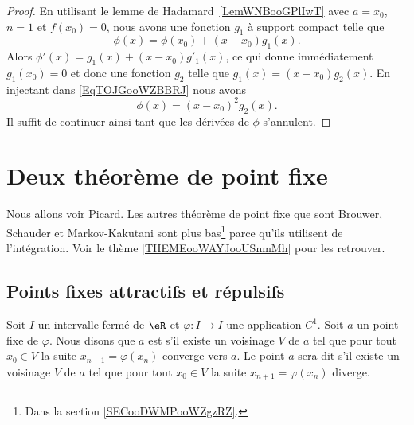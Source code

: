 \begin{proof}
    En utilisant le lemme de Hadamard~\ref{LemWNBooGPlIwT} avec \( a=x_0\), \( n=1\) et \( f(x_0)=0\), nous avons une fonction \( g_1\) à support compact telle que
    \begin{equation}        \label{EqTOJGooWZBBRJ}
        \phi(x)=\phi(x_0)+(x-x_0)g_1(x).
    \end{equation}
    Alors \( \phi'(x)=g_1(x)+(x-x_0)g'_1(x)\), ce qui donne immédiatement \( g_1(x_0)=0\) et donc une fonction \( g_2\) telle que \( g_1(x)=(x-x_0)g_2(x)\). En injectant dans \eqref{EqTOJGooWZBBRJ} nous avons
    \begin{equation}
        \phi(x)=(x-x_0)^2g_2(x).
    \end{equation}
    Il suffit de continuer ainsi tant que les dérivées de \( \phi\) s'annulent.
\end{proof}

\section{Deux théorème de point fixe}

Nous allons voir Picard. Les autres théorème de point fixe que sont Brouwer, Schauder et Markov-Kakutani sont plus bas\footnote{Dans la section \ref{SECooDWMPooWZgzRZ}.} parce qu'ils utilisent de l'intégration. Voir le thème \ref{THEMEooWAYJooUSnmMh} pour les retrouver.

\subsection{Points fixes attractifs et répulsifs}

\begin{definition}      \label{DEFooTMZUooMoBDGC}
    Soit \( I\) un intervalle fermé de \( \eR\) et \( \varphi\colon I\to I\) une application \( C^1\). Soit \( a\) un point fixe de \( \varphi\). Nous disons que \( a\) est  s'il existe un voisinage \( V\) de \( a\) tel que pour tout \( x_0\in V\) la suite \( x_{n+1}=\varphi(x_n)\) converge vers \( a\). Le point \( a\) sera dit  s'il existe un voisinage \( V\) de \( a\) tel que pour tout \( x_0\in V\) la suite \( x_{n+1}=\varphi(x_n)\) diverge.
\end{definition}

